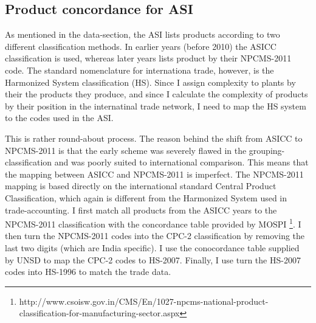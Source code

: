 \documentclass[11pt]{article}
\begin{document}
\begin{appendices}
\subsection{Product concordance for ASI}%
\label{sub:product_concordance_asi}

As mentioned in the data-section, the ASI lists products according to two different classification methods. In earlier years (before 2010) the ASICC classification is used, whereas later years lists product by their NPCMS-2011 code. The standard nomenclature for internationa trade, however, is the Harmonized System classification (HS). Since I assign complexity to plants by their the products they produce, and since I calculate the complexity of products by their position in the internatinal trade network, I need to map the HS system to the codes used in the ASI.

This is rather round-about process. The reason behind the shift from ASICC to NPCMS-2011 is that the early scheme was severely flawed in the grouping-classification and was poorly suited to international comparison. This means that the mapping between ASICC and NPCMS-2011 is imperfect. The NPCMS-2011 mapping is based directly on the international standard Central Product Classification, which again is different from the Harmonized System used in trade-accounting. I first match all products from the ASICC years to the NPCMS-2011 classification with the concordance table provided by MOSPI \footnote{http://www.csoisw.gov.in/CMS/En/1027-npcms-national-product-classification-for-manufacturing-sector.aspx}. I then turn the NPCMS-2011 codes into the CPC-2 classification by removing the last two digits (which are India specific). I use the conocordance table supplied by UNSD to map the CPC-2 codes to HS-2007. Finally, I use turn the HS-2007 codes into HS-1996 to match the trade data. 


\end{appendices}
\end{document}
